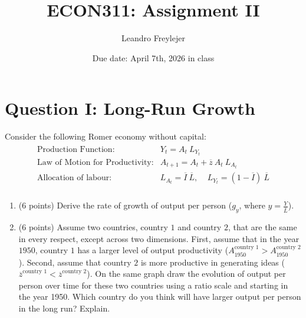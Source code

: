 \documentclass[letterpaper,12pt]{article}
\title{\vspace{-.8in}ECON311: Assignment II}
\author{Leandro Freylejer}
\date{Due date: April 7th, 2026 in class}
\theoremstyle{dotlessS}
\begin{document}
\maketitle
\vspace{-.2in}

\section*{Question I: Long-Run Growth}
Consider the following Romer economy without capital: 
\begin{eqnarray*}
\begin{array}{ll}
\text{Production Function:} & Y_t=A_t \: L_{Y_t} \\[1.4ex]
\text{Law of Motion for Productivity:} & A_{t+1}=A_t+\overline{z} \: A_t \: L_{A_{t}}  \\[1.4ex]
\text{Allocation of labour:} & L_{A_{t}}=\overline{I} \: \overline{L}, \: \: \:  \: \: L_{Y_{t}}=(1-\overline{I}) \: \overline{L}  \\[1.4ex]
\end{array}
\end{eqnarray*}
\begin{enumerate}[label=(\alph*)]
\item (6 points) Derive the rate of growth of output per person ($g_{y}$, where $y=\frac{Y}{\overline{L}}$).
\item (6 points) Assume two countries, country $1$ and country $2$, that are the same in every respect, except across two dimensions. First, assume that in the year $1950$, country $1$ has a larger level of output productivity ($A_{1950}^{\text{country 1}}> A_{1950}^{\text{country 2}}$). Second, assume that country $2$ is more productive in generating ideas ($\overline{z}^{\text{country 1}}<\overline{z}^{\text{country 2}}$). On the same graph draw the evolution of output per person over time for these two countries using a ratio scale and starting in the year 1950. Which country do you think will have larger output per person in the long run? Explain.      
\end{enumerate}  
\end{document}
